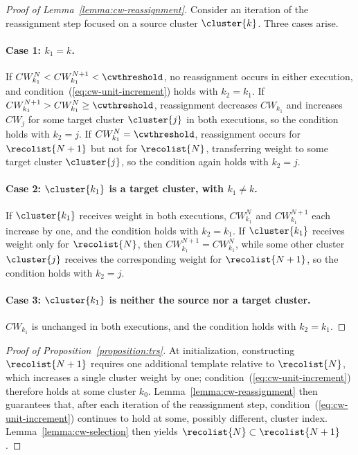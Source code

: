 \begin{proof}[Proof of Lemma~\ref{lemma:cw-reassignment}]
Consider an iteration of the reassignment step focused on a source cluster $\cluster{k}$. Three cases arise.

\paragraph{Case 1: $k_1 = k$.} If $CW_{k_1}^{N} < CW_{k_1}^{N+1} < \cwthreshold$, no reassignment occurs in either execution, and condition~(\ref{eq:cw-unit-increment}) holds with $k_2 = k_1$. If $CW_{k_1}^{N+1} > CW_{k_1}^{N} \ge \cwthreshold$, reassignment decreases $CW_{k_1}$ and increases $CW_j$ for some target cluster $\cluster{j}$ in both executions, so the condition holds with $k_2 = j$. If $CW_{k_1}^{N} = \cwthreshold$, reassignment occurs for $\recolist{N+1}$ but not for $\recolist{N}$, transferring weight to some target cluster $\cluster{j}$, so the condition again holds with $k_2 = j$.

\paragraph{Case 2: $\cluster{k_1}$ is a target cluster, with $k_1 \neq k$.} If $\cluster{k_1}$ receives weight in both executions, $CW_{k_1}^{N}$ and $CW_{k_1}^{N+1}$ each increase by one, and the condition holds with $k_2 = k_1$. If $\cluster{k_1}$ receives weight only for $\recolist{N}$, then $CW_{k_1}^{N+1} = CW_{k_1}^{N}$, while some other cluster $\cluster{j}$ receives the corresponding weight for $\recolist{N+1}$, so the condition holds with $k_2 = j$.

\paragraph{Case 3: $\cluster{k_1}$ is neither the source nor a target cluster.} $CW_{k_1}$ is unchanged in both executions, and the condition holds with $k_2 = k_1$.
\end{proof}

\begin{proof}[Proof of Proposition~\ref{proposition:trs}]
At initialization, constructing $\recolist{N+1}$ requires one additional template relative to $\recolist{N}$, which increases a single cluster weight by one; condition~(\ref{eq:cw-unit-increment}) therefore holds at some cluster $k_0$. Lemma~\ref{lemma:cw-reassignment} then guarantees that, after each iteration of the reassignment step, condition~(\ref{eq:cw-unit-increment}) continues to hold at some, possibly different, cluster index. Lemma~\ref{lemma:cw-selection} then yields $\recolist{N} \subset \recolist{N+1}$.
\end{proof}

